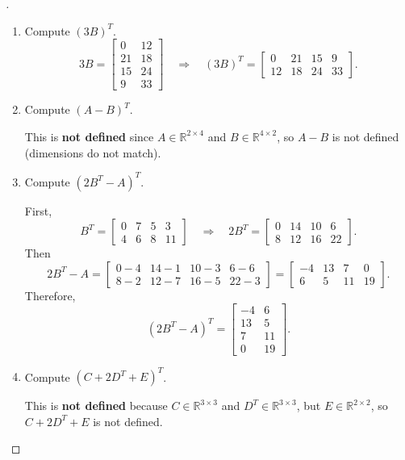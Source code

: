 \documentclass[en,hazy,blue,12pt,normal]{elegantnote}
\begin{document}
\begin{proof}[\solutionname]
\begin{enumerate}
\item[(a)] Compute $(3B)^T$.
\[
3B=
\begin{bmatrix}
0 & 12\\
21 & 18\\
15 & 24\\
9 & 33
\end{bmatrix}
\quad\Longrightarrow\quad
(3B)^T=
\begin{bmatrix}
0 & 21 & 15 & 9\\
12 & 18 & 24 & 33
\end{bmatrix}.
\]

\item[(b)] Compute $(A-B)^T$.

This is \textbf{not defined} since $A\in\mathbb{R}^{2\times 4}$ and $B\in\mathbb{R}^{4\times 2}$, so $A-B$ is not defined (dimensions do not match).

\item[(c)] Compute $(2B^T-A)^T$.

First,
\[
B^T=
\begin{bmatrix}
0 & 7 & 5 & 3\\
4 & 6 & 8 & 11
\end{bmatrix}
\quad\Rightarrow\quad
2B^T=
\begin{bmatrix}
0 & 14 & 10 & 6\\
8 & 12 & 16 & 22
\end{bmatrix}.
\]
Then
\[
2B^T-A=
\begin{bmatrix}
0-4 & 14-1 & 10-3 & 6-6\\
8-2 & 12-7 & 16-5 & 22-3
\end{bmatrix}
=
\begin{bmatrix}
-4 & 13 & 7 & 0\\
6 & 5 & 11 & 19
\end{bmatrix}.
\]
Therefore,
\[
(2B^T-A)^T=
\begin{bmatrix}
-4 & 6\\
13 & 5\\
7 & 11\\
0 & 19
\end{bmatrix}.
\]

\item[(d)] Compute $(C+2D^T+E)^T$.

This is \textbf{not defined} because $C\in\mathbb{R}^{3\times 3}$ and $D^T\in\mathbb{R}^{3\times 3}$, but $E\in\mathbb{R}^{2\times 2}$, so $C+2D^T+E$ is not defined.


\end{enumerate}
\end{proof}
\end{document}
